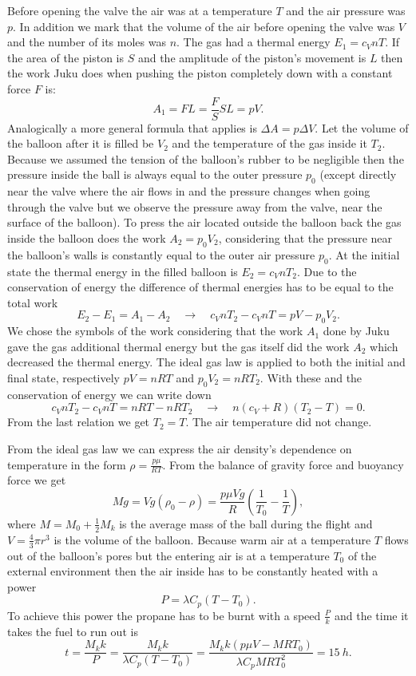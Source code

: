 \documentclass[11pt]{article}
\begin{document}
\solueng
Before opening the valve the air was at a temperature $T$ and the air pressure was $p$. In addition we mark that the volume of the air before opening the valve was $V$ and the number of its moles was $n$. The gas had a thermal energy $E_1=c_VnT$. If the area of the piston is $S$ and the amplitude of the piston’s movement is $L$ then the work Juku does when pushing the piston completely down with a constant force $F$ is:
$$A_1=FL=\frac{F}{S}SL=pV.$$ 
Analogically a more general formula that applies is $\Delta A = p \Delta V$. Let the volume of the balloon after it is filled be $V_2$ and the temperature of the gas inside it $T_2$. Because we assumed the tension of the balloon’s rubber to be negligible then the pressure inside the ball is always equal to the outer pressure $p_0$ (except directly near the valve where the air flows in and the pressure changes when going through the valve but we observe the pressure away from the valve, near the surface of the balloon). To press the air located outside the balloon back the gas inside the balloon does the work $A_2=p_0V_2$, considering that the pressure near the balloon’s walls is constantly equal to the outer air pressure $p_0$. At the initial state the thermal energy in the filled balloon is $E_2=c_VnT_2$. Due to the conservation of energy the difference of thermal energies has to be equal to the total work
$$E_2-E_1 = A_1-A_2 \quad\rightarrow\quad c_VnT_2-c_VnT = pV - p_0V_2.$$ 
We chose the symbols of the work considering that the work $A_1$ done by Juku gave the gas additional thermal energy but the gas itself did the work $A_2$ which decreased the thermal energy. The ideal gas law is applied to both the initial and final state, respectively $pV=nRT$ and $p_0V_2=nRT_2$. With these and the conservation of energy we can write down
$$c_VnT_2-c_VnT = nRT-nRT_2 \quad\rightarrow\quad n(c_V+R)(T_2-T)=0.$$ 
From the last relation we get $T_2=T$. The air temperature did not change.
\probend
\bigskip


\solueng
From the ideal gas law we can express the air density’s dependence on temperature in the form $\rho = \frac{p \mu}{R T}$. From the balance of gravity force and buoyancy force we get
\[
M g = V g (\rho_0 - \rho) = \frac{p \mu V g}{R} (\frac{1}{T_0} - \frac{1}{T}),
\] 
where $M = M_0 + \frac{1}{2} M_k$ is the average mass of the ball during the flight and $V = \frac{4}{3} \pi r^3$ is the volume of the balloon. Because warm air at a temperature $T$ flows out of the balloon’s pores but the entering air is at a temperature $T_0$ of the external environment then the air inside has to be constantly heated with a power
\[
P = \lambda C_p (T - T_0).
\] 
To achieve this power the propane has to be burnt with a speed $\frac{P}{k}$ and the time it takes the fuel to run out is
\[
t = \frac{M_k k}{P} = \frac{M_k k}{\lambda C_p (T - T_0)} = \frac{M_k k (p \mu V - M R T_0)}{\lambda C_p M R T_0^2} = \SI{15}{h}.
\]
\probend
\bigskip
\end{document}
